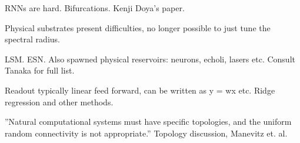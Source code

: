 RNNs are hard. Bifurcations. Kenji Doya's paper.

Physical substrates present difficulties, no longer possible to just tune the spectral radius.

LSM. ESN. Also spawned physical reservoirs: neurons, echoli, lasers etc. Consult Tanaka for full list.

Readout typically linear feed forward, can be written as y = wx etc. Ridge regression and other methods.

''Natural computational systems must have specific topologies, and the uniform random connectivity is not appropriate.'' Topology discussion, Manevitz et. al.